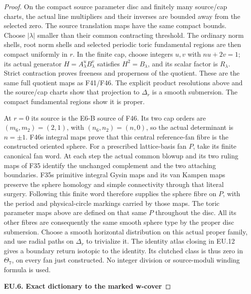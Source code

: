 \begin{proof}
On the compact source parameter disc and finitely many source/cap
charts, the actual line multipliers and their inverses are bounded
away from the selected zero. The source translation maps have the
same compact bounds. Choose \(|\lambda|\) smaller than their common
contracting threshold. The ordinary norm shells, root norm shells
and selected periodic toric fundamental regions are then compact
uniformly in \(r\). In the finite cap, choose integers \(u,v\) with
\(nu+2v=1\); its actual generator
\(H=A_\lambda^uB_\lambda^v\) satisfies \(H^2=B_\lambda\), and its
scalar factor is \(R_\lambda\). Strict contraction proves freeness
and properness of the quotient. These are the same full quotient
maps as F41/F46. The explicit product resolutions above and the
source/cap charts show that projection to \(\Delta_r\) is a smooth
submersion. The compact fundamental regions show it is proper.

At \(r=0\) its source is the E6-B source of F46. Its two cap orders
are \((m_6,m_2)=(2,1)\), with \((n_6,n_2)=(n,0)\), so the actual
determinant is \(n=\pm1\). F46\textquotesingle s integral maps prove that this
central reference-fan fibre is the constructed oriented sphere.
For a prescribed lattice-basis fan \(P\), take its finite canonical
fan word. At each step the actual common blowup and its two ruling
maps of F35 identify the unchanged complement and the two attaching
boundaries. F35\textquotesingle s primitive integral Gysin maps and its van Kampen
maps preserve the sphere homology and simple connectivity through
that literal surgery. Following this finite word therefore supplies
the sphere fibre on \(P\), with the period and physical-circle
markings carried by those maps. The toric parameter maps above are
defined on that same \(P\) throughout the disc. All its other
fibres are consequently the same smooth sphere type by the proper
disc submersion. Choose a smooth horizontal distribution on this actual
proper family, and use radial paths on \(\Delta_r\) to trivialize
it. The identity atlas closing in EU.12 gives a boundary return
isotopic to the identity. Its clutched class is thus zero in
\(\Theta_7\), on every fan just constructed. No integer division
or source-moduli winding formula is used.

\par

\medskip\noindent\textbf{EU.6. Exact dictionary to the marked w-cover}

\par\nobreak


\end{proof}
